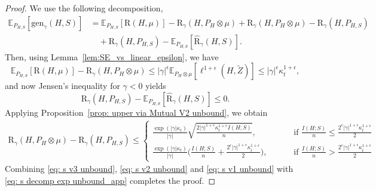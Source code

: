 \documentclass{article}
\theoremstyle{plain}
\theoremstyle{plain}
\theoremstyle{definition}
\theoremstyle{remark}
\newcommand{\RTERM}{\widehat{\mathrm{R}}_{\gamma}}
\newcommand{\RTrue}{\mathrm{R}}
\newcommand{\RTET}{\mathrm{R}_{\gamma}}
\newcommand{\mbE}{\mathbb{E}}
\begin{document}
\begin{proof}
We use the following decomposition, 
     \begin{align}\label{eq: s decomp exp unbound_app}
        \mbE_{P_{H,S}}[\mathrm{gen}_{\gamma}(H,S)]%
            &= \mbE_{P_{H,S}}[ \RTrue(H,\mu)]- \RTET(H,P_{H}\otimes \mu)+ \RTET(H,P_{H}\otimes \mu)-\RTET(H,P_{H,S})\\
            &\quad+ \RTET(H,P_{H,S}) -\mbE_{P_{H,S}}[\RTERM(H,S)]. \nonumber 
    \end{align}
Then, using Lemma~\ref{lem:SE_vs_linear_epsilon}, we have 
\begin{equation}\label{eq: s v1 unbound} %
     \mbE_{P_{H,S}}[ \RTrue(H,\mu)]- \RTET(H,P_{H}\otimes \mu)
     \leq |\gamma|^\epsilon\mbE_{P_H\otimes \mu}[\ell^{1+\epsilon}(H,\tilde Z)]\leq |\gamma|^\epsilon\kappa_t^{1+\epsilon} ,
  \end{equation}
and now Jensen's inequality for $\gamma<0$
 yields
\begin{equation}\label{eq: s v3 unbound}
    \RTET(H,P_{H,S}) -\mbE_{P_{H,S}}[\RTERM(H,S)]\leq 0.
\end{equation}
Applying Proposition~\ref{prop: upper via Mutual V2 unbound}, we obtain 
   \begin{equation}\label{eq: s v2 unbound}
    \begin{split}
          \RTET(H,P_{H}\otimes \mu)-\RTET(H,P_{H,S})\leq  \begin{cases}
            \frac{\exp(|\gamma| \kappa_t)}{|\gamma|} \sqrt{\frac{2|\gamma|^{1+\epsilon} \kappa_t^{1+\epsilon} I(H;S)}{n}},\qquad &\mbox{ if }\frac{I(H;S)}{n}\leq \frac{2^{\epsilon}|\gamma|^{1+\epsilon} \kappa_t^{1+\epsilon}}{2}\\
              \frac{\exp(|\gamma| \kappa_t)}{ |\gamma|}\Big( \frac{ I(H;S)}{n}+\frac{2^{\epsilon}|\gamma|^{1+\epsilon} \kappa_t^{1+\epsilon}}{2}\Big),\qquad & \mbox{ if } \frac{I(H;S)}{n}>\frac{2^{\epsilon}|\gamma|^{1+\epsilon} \kappa_t^{1+\epsilon}}{2}
          \end{cases}
    \end{split} \nonumber 
\end{equation}
  Combining \eqref{eq: s v3 unbound}, \eqref{eq: s v2 unbound} and \eqref{eq: s v1 unbound} with \eqref{eq: s decomp exp unbound_app} completes the proof.
\end{proof}
\end{document}
